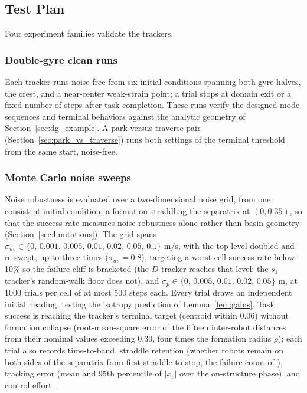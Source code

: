 \documentclass[lettersize,journal]{IEEEtran}
\begin{document}
\subsection{Test Plan}
\label{sec:test_plan}

Four experiment families validate the trackers.

\subsubsection{Double-gyre clean runs}
Each tracker runs noise-free from six initial conditions spanning both
gyre halves, the crest, and a near-center weak-strain point; a trial
stops at domain exit or a fixed number of steps after task completion.
These runs verify the designed mode sequences and terminal behaviors
against the analytic geometry of Section~\ref{sec:dg_example}. A
park-versus-traverse pair (Section~\ref{sec:park_vs_traverse}) runs
both settings of the terminal threshold from the same start,
noise-free.

\subsubsection{Monte Carlo noise sweeps}
Noise robustness is evaluated over a two-dimensional noise grid, from
one consistent initial condition, a formation straddling the
separatrix at $(0, 0.35)$, so that the success rate measures noise
robustness alone rather than basin geometry
(Section~\ref{sec:limitations}). The grid spans $\sigma_{uv} \in \{0,\,
0.001,\, 0.005,\, 0.01,\, 0.02,\, 0.05,\, 0.1\}$ m/s, with the top
level doubled and re-swept, up to three times ($\sigma_{uv} = 0.8$),
targeting a worst-cell success rate below 10\% so the failure cliff is
bracketed (the $D$ tracker reaches that level; the $s_1$ tracker's
random-walk floor does not), and $\sigma_p \in
\{0,\, 0.005,\, 0.01,\, 0.02,\, 0.05\}$ m, at 1000 trials per cell of
at most 500 steps each. Every trial draws an independent initial
heading, testing the isotropy prediction of Lemma~\ref{lem:gains}.
Task success is reaching the tracker's terminal target (centroid
within 0.06) without formation collapse (root-mean-square error of the
fifteen inter-robot distances from their nominal values exceeding
0.30, four times the formation radius $\rho$); each trial also
records time-to-band, straddle retention (whether robots remain on
both sides of the separatrix from first straddle to stop, the failure
count of \cite{9}), tracking error (mean and 95th percentile of
$|x_c|$ over the on-structure phase), and control effort.
\end{document}
